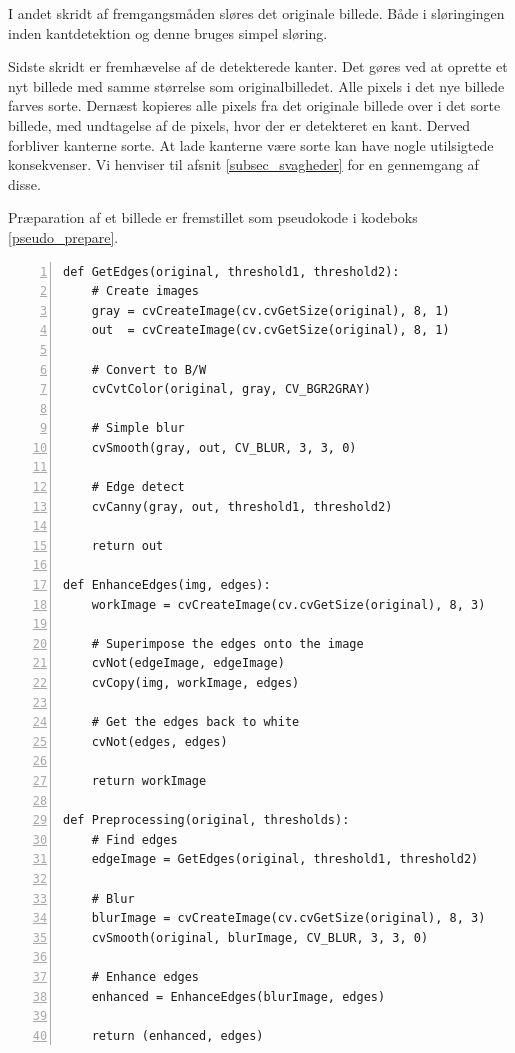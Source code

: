 {I andet skridt af fremgangsmåden sløres det originale billede. Både i
sløringingen inden kantdetektion og denne bruges simpel sløring.

Sidste skridt er fremhævelse af de detekterede kanter. Det gøres ved at
oprette et nyt billede med samme størrelse som originalbilledet. Alle
pixels i det nye billede farves sorte. Dernæst kopieres alle pixels fra
det originale billede over i det sorte billede, med undtagelse af de
pixels, hvor der er detekteret en kant. Derved forbliver kanterne sorte.
At lade kanterne være sorte kan have nogle utilsigtede konsekvenser. Vi
henviser til afsnit \ref{subsec_svagheder} for en gennemgang af disse.

Præparation af et billede er fremstillet som pseudokode i kodeboks
\ref{pseudo_prepare}.

\begin{lstlisting}[caption={Pseudokode for metoder til præparation af
    billeder.},captionpos=b,label={pseudo_prepare},numbers=left,
    frame=tb, breaklines=false, float=h]
def GetEdges(original, threshold1, threshold2):
    # Create images
    gray = cvCreateImage(cv.cvGetSize(original), 8, 1)
    out  = cvCreateImage(cv.cvGetSize(original), 8, 1)

    # Convert to B/W
    cvCvtColor(original, gray, CV_BGR2GRAY)

    # Simple blur
    cvSmooth(gray, out, CV_BLUR, 3, 3, 0)

    # Edge detect
    cvCanny(gray, out, threshold1, threshold2)

    return out

def EnhanceEdges(img, edges):
    workImage = cvCreateImage(cv.cvGetSize(original), 8, 3)

    # Superimpose the edges onto the image
    cvNot(edgeImage, edgeImage)
    cvCopy(img, workImage, edges)

    # Get the edges back to white
    cvNot(edges, edges)

    return workImage

def Preprocessing(original, thresholds):
    # Find edges
    edgeImage = GetEdges(original, threshold1, threshold2)

    # Blur
    blurImage = cvCreateImage(cv.cvGetSize(original), 8, 3)
    cvSmooth(original, blurImage, CV_BLUR, 3, 3, 0)

    # Enhance edges
    enhanced = EnhanceEdges(blurImage, edges)

    return (enhanced, edges)

\end{lstlisting}

}
